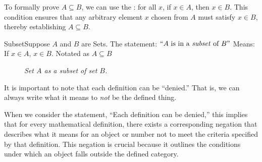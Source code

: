 To formally prove \( A \subseteq B \), we can use the : for all \( x \), if \( x \in A \), then \( x \in B \). This condition ensures that any arbitrary element \( x \) chosen from \( A \) must satisfy \( x \in B \), thereby establishing \( A \subseteq B \).

\begin{definition}
    {Subset}Suppose \(A\) and \(B\) are Sets. The statement: \(\text{``}A \text{ is in a \textit{subset} of } B\text{''}\) 
    Means: If \(x \in A\), \(x \in B\). Notated as \(A \subseteq B\)
\end{definition}



\begin{figure}[htbp]
    \centering
    \caption{\textit{Set \(A\) as a subset of set \(B\).}}
\end{figure}


It is important to note that each definition can be ``denied.'' That is, we can always write what it means to \textit{not} be the defined thing.

When we consider the statement, ``Each definition can be denied,'' this implies that for every mathematical definition, there exists a corresponding negation that describes what it means for an object or number not to meet the criteria specified by that definition. This negation is crucial because it outlines the conditions under which an object falls outside the defined category.

